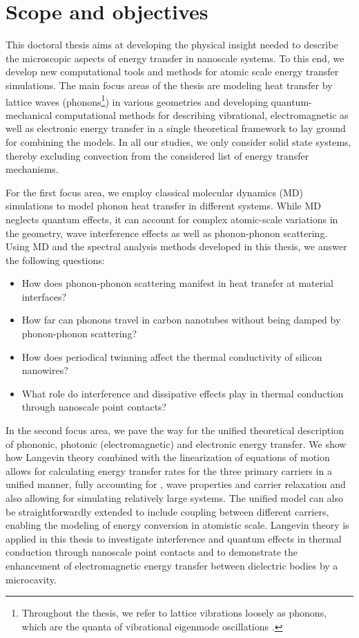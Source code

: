 \section{Scope and objectives}

This doctoral thesis aims at developing the physical insight needed to describe the microscopic aspects of energy transfer in nanoscale systems. To this end, we develop new computational tools and methods for atomic scale energy transfer simulations. The main focus areas of the thesis are modeling heat transfer by lattice waves (phonons\footnote{Throughout the thesis, we refer to lattice vibrations loosely as phonons, which are the quanta of vibrational eigenmode oscillations \cite{ziman}.}) in various geometries and developing quantum-mechanical computational methods for describing vibrational, electromagnetic as well as electronic energy transfer in a single theoretical framework to lay ground for combining the models. In all our studies, we only consider solid state systems, thereby excluding convection \cite{chen} from the considered list of energy transfer mechanisms. 

For the first focus area, we employ classical molecular dynamics (MD) simulations to model phonon heat transfer in different systems. While MD neglects quantum effects, it can account for complex atomic-scale variations in the geometry, wave interference effects as well as phonon-phonon scattering. Using MD and the spectral analysis methods developed in this thesis, we answer the following questions: 
 \begin{itemize}
  \item How does phonon-phonon scattering manifest in heat transfer at material interfaces?
  \item How far can phonons travel in carbon nanotubes without being damped by phonon-phonon scattering?
  \item How does periodical twinning affect the thermal conductivity of silicon nanowires?
  \item What role do interference and dissipative effects play in thermal conduction through nanoscale point contacts?
 \end{itemize}

In the second focus area, we pave the way for the unified theoretical description of phononic, photonic (electromagnetic) and electronic energy transfer. We show how Langevin theory \cite{langevin08,zwanzig} combined with the linearization of equations of motion allows for calculating energy transfer rates for the three primary carriers in a unified manner, fully accounting for , wave properties and carrier relaxation and also allowing for simulating relatively large systems. The unified model can also be straightforwardly extended to include coupling between different carriers, enabling the modeling of energy conversion in atomistic scale. Langevin theory is applied in this thesis to investigate interference and quantum effects in thermal conduction through nanoscale point contacts and to demonstrate the enhancement of electromagnetic energy transfer between dielectric bodies by a microcavity.

